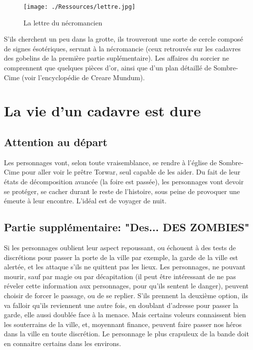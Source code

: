 \documentclass[a4paper, 11pt]{article}
\begin{document}
\begin{figure}[p]
\begin{center}
\hypertarget{lettre}{}
\texttt{[image: ./Ressources/lettre.jpg]}
\caption{La lettre du nécromancien}
\end{center}
\end{figure}
S'ils cherchent un peu dans la grotte, ils trouveront une sorte de cercle composé de signes ésotériques, servant à la nécromancie (ceux retrouvés sur les cadavres des gobelins de la première partie suplémentaire). Les affaires du sorcier ne comprennent que quelques pièces d'or, ainsi que d'un plan détaillé de Sombre-Cime (voir l'encyclopédie de Creare Mundum).

\section{La vie d'un cadavre est dure}
\subsection{Attention au départ}
Les personnages vont, selon toute vraisemblance, se rendre à l'église de Sombre-Cime pour aller voir le prêtre Torwar, seul capable de les aider.
Du fait de leur états de décomposition avancée (la foire est passée), les personnages vont devoir se protéger, se cacher durant le reste de l'histoire, sous peine de provoquer une émeute à leur encontre. L'idéal est de voyager de nuit.
\subsection{Partie supplémentaire: "Des... DES ZOMBIES"} 
Si les personnages oublient leur aspect repoussant, ou échouent à des tests de discrétions pour passer la porte de la ville par exemple, la garde de la ville est alertée, et les attaque s'ils ne quittent pas les lieux. Les personnages, ne pouvant mourir, sauf par magie ou par décapitation (il peut être intéressant de ne pas réveler cette information aux personnages, pour qu'ils sentent le danger), peuvent choisir de forcer le passage, ou de se replier. S'ils prennent la deuxième option, ils va falloir qu'ils reviennent une autre fois, en doublant d'adresse pour passer la garde, elle aussi doublée face à la menace.
\newline
Mais certains voleurs connaissent bien les souterrains de la ville, et, moyennant finance, peuvent faire passer nos héros dans la ville en toute discrétion. Le personnage le plus crapuleux de la bande doit en connaitre certains dans les environs.
\end{document}
